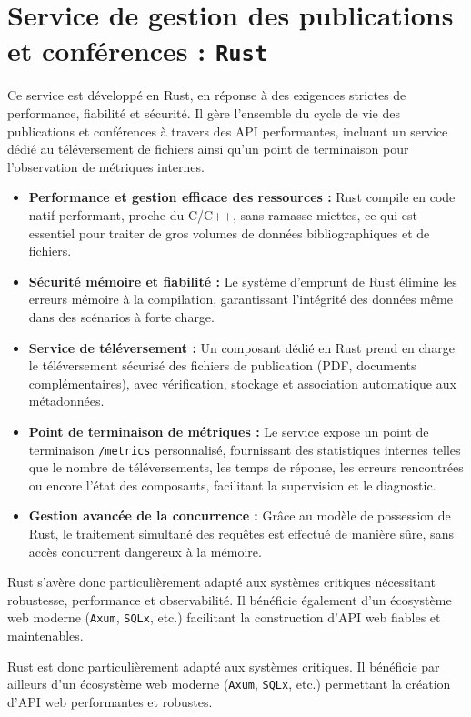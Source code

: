 \documentclass[12pt]{rapportPfe}
\begin{document}
\section{Service de gestion des publications et conférences : \texttt{Rust}}

Ce service est développé en Rust, en réponse à des exigences strictes de performance, fiabilité et sécurité. Il gère l’ensemble du cycle de vie des publications et conférences à travers des API performantes, incluant un service dédié au téléversement de fichiers ainsi qu’un point de terminaison pour l’observation de métriques internes.

\begin{itemize}
    \item \textbf{Performance et gestion efficace des ressources :} Rust compile en code natif performant, proche du C/C++, sans ramasse-miettes, ce qui est essentiel pour traiter de gros volumes de données bibliographiques et de fichiers.
    \item \textbf{Sécurité mémoire et fiabilité :} Le système d’emprunt de Rust élimine les erreurs mémoire à la compilation, garantissant l’intégrité des données même dans des scénarios à forte charge.
    \item \textbf{Service de téléversement :} Un composant dédié en Rust prend en charge le téléversement sécurisé des fichiers de publication (PDF, documents complémentaires), avec vérification, stockage et association automatique aux métadonnées.
    \item \textbf{Point de terminaison de métriques :} Le service expose un point de terminaison \texttt{/metrics} personnalisé, fournissant des statistiques internes telles que le nombre de téléversements, les temps de réponse, les erreurs rencontrées ou encore l’état des composants, facilitant la supervision et le diagnostic.
    \item \textbf{Gestion avancée de la concurrence :} Grâce au modèle de possession de Rust, le traitement simultané des requêtes est effectué de manière sûre, sans accès concurrent dangereux à la mémoire.
\end{itemize}

Rust s’avère donc particulièrement adapté aux systèmes critiques nécessitant robustesse, performance et observabilité. Il bénéficie également d’un écosystème web moderne (\texttt{Axum}, \texttt{SQLx}, etc.) facilitant la construction d’API web fiables et maintenables.

Rust est donc particulièrement adapté aux systèmes critiques. Il bénéficie par ailleurs d’un écosystème web moderne (\texttt{Axum}, \texttt{SQLx}, etc.) permettant la création d’API web performantes et robustes.
\end{document}
